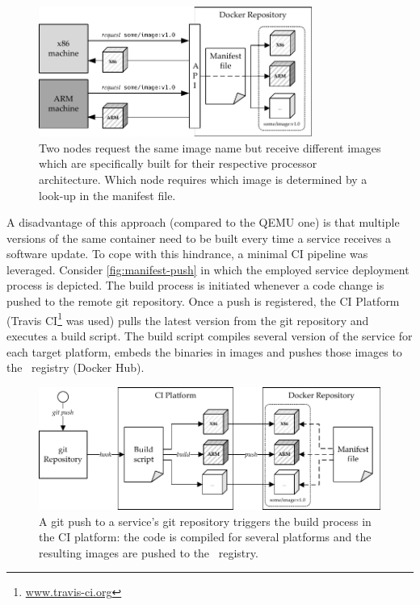 \begin{figure}[htpb]
  \centering
  \includegraphics[width=0.8\textwidth]{figures/manifest-pull}
  \caption[Pulling \docker\ images via manifest file]{Two nodes request the same image name but receive different images which are specifically built for their respective processor architecture. Which node requires which image is determined by a look-up in the manifest file.}\label{fig:manifest-pull} 
\end{figure}

A disadvantage of this approach (compared to the QEMU one) is that multiple versions of the same container need to be built every time a service receives a software update. To cope with this hindrance, a minimal CI pipeline was leveraged. Consider \autoref{fig:manifest-push} in which the employed service deployment process is depicted. The build process is initiated whenever a code change is pushed to the remote git repository. Once a push is registered, the CI Platform (Travis CI\footnote{\url{www.travis-ci.org}} was used) pulls the latest version from the git repository and executes a build script. The build script compiles several version of the service for each target platform, embeds the binaries in images and pushes those images to the \docker\ registry (Docker Hub).

\begin{figure}[htpb]
  \centering
  \includegraphics[width=\textwidth]{figures/manifest-push}
  \caption[Pushing \docker\ images via CI]{A git push to a service's git repository triggers the build process in the CI platform: the code is compiled for several platforms and the resulting images are pushed to the \docker\ registry.}\label{fig:manifest-push} 
\end{figure}

